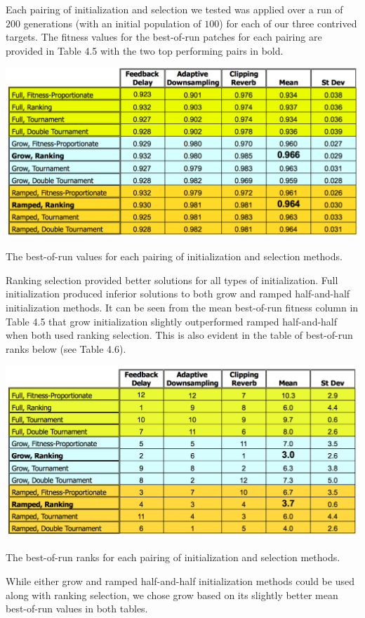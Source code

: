\documentclass[a4paper,12pt]{report} 	%
\numberwithin{figure}{chapter}
\numberwithin{table}{chapter}
\numberwithin{equation}{chapter}
\begin{document}
\begin{flushleft}
Each pairing of initialization and selection we tested was applied over a run of $200$ generations (with an initial population of $100$) for each of our three contrived targets. The fitness values for the best-of-run patches for each pairing are provided in Table 4.5 with the two top performing pairs in bold.
\begin{table}[h!]
\begin{center}
\includegraphics[scale=0.6,width=\linewidth]{InitializationTable1}
\caption[Initialization and Selection Best-of-Run Values]{The best-of-run values for each pairing of initialization and selection methods.}
\end{center}
\end{table}
Ranking selection provided better solutions for all types of initialization. Full initialization produced inferior solutions to both grow and ramped half-and-half initialization methods. It can be seen from the mean best-of-run fitness column in Table 4.5 that grow initialization slightly outperformed ramped half-and-half when both used ranking selection. This is also evident in the table of best-of-run ranks below (see Table 4.6).
\begin{table}[h!]
\begin{center}
\includegraphics[scale=0.6,width=\linewidth]{InitializationTable2}
\caption[Initialization and Selection Best-of-Run Ranks]{The best-of-run ranks for each pairing of initialization and selection methods.}
\end{center}
\end{table}
While either grow and ramped half-and-half initialization methods could be used along with ranking selection, we chose grow based on its slightly better mean best-of-run values in both tables.


\end{flushleft}
\end{document}
